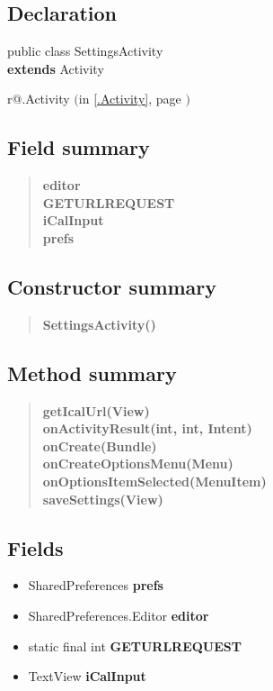 \documentclass[11pt,a4paper]{report}
\makeatletter
\newcommand{\refdefined}[1]{
\expandafter\ifx\csname r@#1\endcsname\relax
\relax\else
{$($in \ref{#1}, page \pageref{#1}$)$}\fi}
\makeatother
\begin{document}
{{\subsection{Declaration}{
\small public class SettingsActivity
\\ {\bf  extends} Activity
\refdefined{.Activity}}
\subsection{Field summary}{
\begin{verse}
{\bf editor} \\
{\bf GETURLREQUEST} \\
{\bf iCalInput} \\
{\bf prefs} \\
\end{verse}
}
\subsection{Constructor summary}{
\begin{verse}
{\bf SettingsActivity()} \\
\end{verse}
}
\subsection{Method summary}{
\begin{verse}
{\bf getIcalUrl(View)} \\
{\bf onActivityResult(int, int, Intent)} \\
{\bf onCreate(Bundle)} \\
{\bf onCreateOptionsMenu(Menu)} \\
{\bf onOptionsItemSelected(MenuItem)} \\
{\bf saveSettings(View)} \\
\end{verse}
}
\subsection{Fields}{
\begin{itemize}
\item{
\label{is.mpg.ruglan.SettingsActivity.prefs} SharedPreferences {\bf  prefs}}
\item{
\label{is.mpg.ruglan.SettingsActivity.editor} SharedPreferences.Editor {\bf  editor}}
\item{
\label{is.mpg.ruglan.SettingsActivity.GETURLREQUEST}static final int {\bf  GETURLREQUEST}}
\item{
\label{is.mpg.ruglan.SettingsActivity.iCalInput} TextView {\bf  iCalInput}}
\end{itemize}
}
}}
\end{document}
